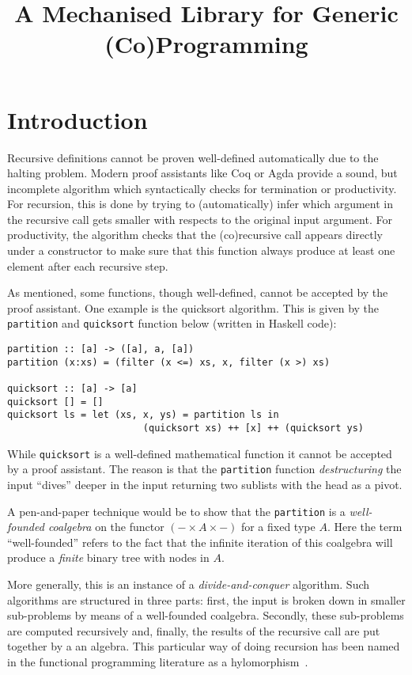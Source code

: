 \documentclass{article}
\title{A Mechanised Library for Generic (Co)Programming}
\author{}
\newcommand{\haskell}[1]{\texttt{#1}}
\begin{document}
\maketitle
\section{Introduction}

Recursive definitions cannot be proven well-defined automatically due to the
halting problem. Modern proof assistants like Coq or Agda provide a sound, but
incomplete algorithm which syntactically checks for termination or productivity.
For recursion, this is done by trying to (automatically) infer which argument in
the recursive call gets smaller with respects to the original input argument.
For productivity, the algorithm checks that the (co)recursive call appears
directly under a constructor to make sure that this function always produce at
least one element after each recursive step.

As mentioned, some functions, though well-defined, cannot be accepted by the
proof assistant. One example is the quicksort algorithm. This is given by the \haskell{partition} and \haskell{quicksort} function below (written in
Haskell code):
\begin{verbatim}
partition :: [a] -> ([a], a, [a])
partition (x:xs) = (filter (x <=) xs, x, filter (x >) xs)

quicksort :: [a] -> [a]
quicksort [] = []
quicksort ls = let (xs, x, ys) = partition ls in
                        (quicksort xs) ++ [x] ++ (quicksort ys)
\end{verbatim}
While \haskell{quicksort} is a well-defined mathematical function it cannot be
accepted by a proof assistant.  The reason is that the \haskell{partition}
function \emph{destructuring} the input ``dives'' deeper in the input returning
two sublists with the head as a pivot.

A pen-and-paper technique would be to show that the \haskell{partition} is a
\emph{well-founded coalgebra} on the functor $(- \times A \times -)$ for a fixed
type $A$. Here the term ``well-founded'' refers to the fact that the infinite
iteration of this coalgebra will produce a \emph{finite} binary tree with nodes
in $A$.

More generally, this is an instance of a \emph{divide-and-conquer} algorithm.
Such algorithms are structured in three parts: first, the input is broken down
in smaller sub-problems by means of a well-founded coalgebra. Secondly, these
sub-problems are computed recursively and, finally, the results of the recursive
call are put together by a an algebra. This particular way of doing recursion
has been named in the functional programming literature as a
hylomorphism~\cite{MeijerFP91, HuIT96}.
\end{document}
